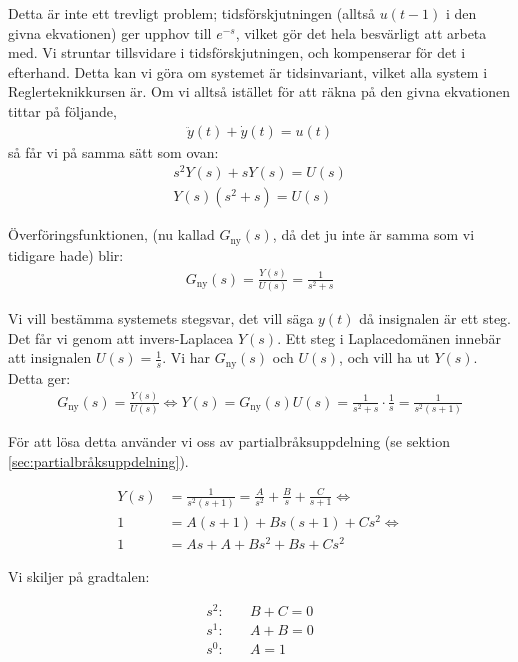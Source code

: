 \documentclass[a4paper]{article}
\begin{document}
Detta är inte ett trevligt problem; tidsförskjutningen (alltså $u(t-1)$ i den givna ekvationen) ger upphov till $e^{-s}$, vilket gör det hela besvärligt att arbeta med. Vi struntar tillsvidare i tidsförskjutningen, och kompenserar för det i efterhand. Detta kan vi göra om systemet är tidsinvariant, vilket alla system i Reglerteknikkursen är. Om vi alltså istället för att räkna på den givna ekvationen tittar på följande,
\begin{align*}
  \ddot{y}(t) + \dot{y}(t) = u(t)
\end{align*}
så får vi på samma sätt som ovan:
\begin{align*}
  s^2Y(s) + sY(s) = U(s) \\
  Y(s)(s^2 + s) = U(s)
\end{align*}

Överföringsfunktionen, (nu kallad $G_{\text{ny}}(s)$, då det ju inte är samma som vi tidigare hade) blir:
\begin{align*}
  G_{\text{ny}}(s) = \frac{Y(s)}{U(s)} = \frac{1}{s^2 + s}
\end{align*}

Vi vill bestämma systemets stegsvar, det vill säga $y(t)$ då insignalen är ett steg. Det får vi genom att invers-Laplacea $Y(s)$. Ett steg i Laplacedomänen innebär att insignalen $U(s) = \frac{1}{s}$. Vi har $G_{\text{ny}}(s)$ och $U(s)$, och vill ha ut $Y(s)$. Detta ger:
\begin{align*}
  G_{\text{ny}}(s) = \frac{Y(s)}{U(s)} \Longleftrightarrow Y(s) = G_{\text{ny}}(s)U(s) = \frac{1}{s^2 + s} \cdot \frac{1}{s} = \frac{1}{s^2(s + 1)}
\end{align*}

För att lösa detta använder vi oss av partialbråksuppdelning (se sektion \ref{sec:partialbråksuppdelning}).

\begin{align*}
  Y(s) &= \frac{1}{s^2(s + 1)} = \frac{A}{s^2} + \frac{B}{s} + \frac{C}{s+1} \Longleftrightarrow \\
  1 &= A(s + 1) + Bs(s + 1) + Cs^2 \Longleftrightarrow \\
  1 &= As + A + Bs^2 + Bs + Cs^2
\end{align*}

Vi skiljer på gradtalen:

\begin{align*}
  s^2: & \quad B + C = 0\\
  s^1: & \quad A + B = 0\\
  s^0: & \quad A     = 1
\end{align*}
\end{document}
